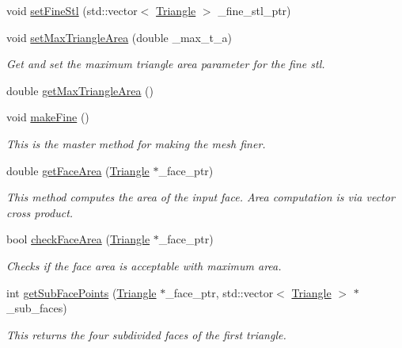 \begin{DoxyCompactItemize}
void \hyperlink{classkia_1_1Mesh_af0f6158ae5de4634dab1d8cad9def511}{set\-Fine\-Stl} (std\-::vector$<$ \hyperlink{classkia_1_1Triangle}{Triangle} $>$ \-\_\-fine\-\_\-stl\-\_\-ptr)
\item 
void \hyperlink{classkia_1_1Mesh_a6855a90086c90ba0d5d4e7d910d24cbc}{set\-Max\-Triangle\-Area} (double \-\_\-max\-\_\-t\-\_\-a)
\begin{DoxyCompactList}\small\item\em Get and set the maximum triangle area parameter for the fine stl. \end{DoxyCompactList}\item 
double \hyperlink{classkia_1_1Mesh_a13e4a82e051943919b706dc023ce2d70}{get\-Max\-Triangle\-Area} ()
\item 
void \hyperlink{classkia_1_1Mesh_af1b85ecc64f3960e9e3691605a316ccc}{make\-Fine} ()
\begin{DoxyCompactList}\small\item\em This is the master method for making the mesh finer. \end{DoxyCompactList}\item 
double \hyperlink{classkia_1_1Mesh_a00806120bf5d7084c0e3556a34574bd6}{get\-Face\-Area} (\hyperlink{classkia_1_1Triangle}{Triangle} $\ast$\-\_\-face\-\_\-ptr)
\begin{DoxyCompactList}\small\item\em This method computes the area of the input face. Area computation is via vector cross product. \end{DoxyCompactList}\item 
bool \hyperlink{classkia_1_1Mesh_a60d33fd5333048747c4de96519163bdf}{check\-Face\-Area} (\hyperlink{classkia_1_1Triangle}{Triangle} $\ast$\-\_\-face\-\_\-ptr)
\begin{DoxyCompactList}\small\item\em Checks if the face area is acceptable with maximum area. \end{DoxyCompactList}\item 
int \hyperlink{classkia_1_1Mesh_a619aae024749b58f9cfc81b87656a4c4}{get\-Sub\-Face\-Points} (\hyperlink{classkia_1_1Triangle}{Triangle} $\ast$\-\_\-face\-\_\-ptr, std\-::vector$<$ \hyperlink{classkia_1_1Triangle}{Triangle} $>$ $\ast$\-\_\-sub\-\_\-faces)
\begin{DoxyCompactList}\small\item\em This returns the four subdivided faces of the first triangle. \end{DoxyCompactList}\item 

\end{DoxyCompactItemize}
